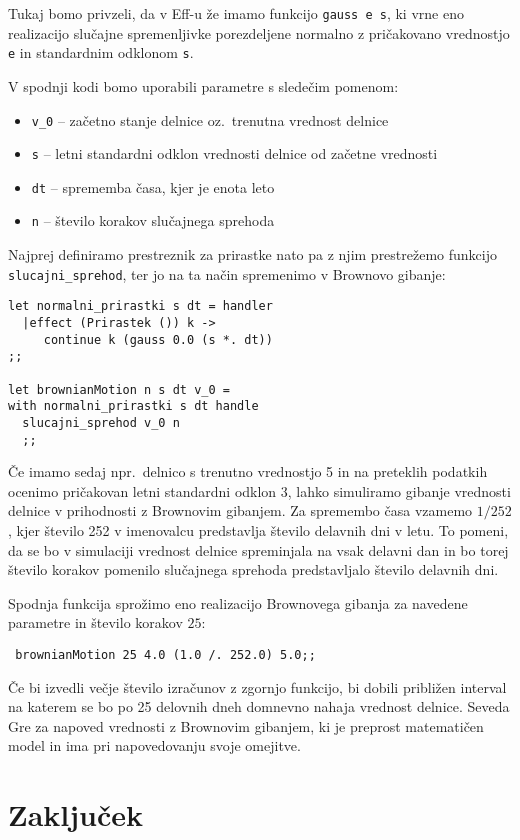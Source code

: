 \documentclass[a4paper,12pt]{article}
\theoremstyle{definition} %
\begin{document}
Tukaj bomo privzeli, da v Eff-u že imamo funkcijo \lstinline{gauss e s}, ki vrne eno realizacijo slučajne spremenljivke porezdeljene normalno z pričakovano vrednostjo \lstinline{e} in standardnim odklonom \lstinline{s}.

V spodnji kodi bomo uporabili parametre s sledečim pomenom:
\begin{itemize}
\item \lstinline{v_0} -- začetno stanje delnice oz.\ trenutna vrednost delnice
\item \lstinline{s} -- letni standardni odklon vrednosti delnice od začetne vrednosti
\item \lstinline{dt} -- sprememba časa, kjer je enota leto
\item \lstinline{n} -- število korakov slučajnega sprehoda
\end{itemize}
Najprej definiramo prestreznik za prirastke nato pa z njim prestrežemo funkcijo \lstinline{slucajni_sprehod}, ter jo na ta način spremenimo v Brownovo gibanje:
 \begin{lstlisting}
let normalni_prirastki s dt = handler
  |effect (Prirastek ()) k -> 
     continue k (gauss 0.0 (s *. dt))
;;

let brownianMotion n s dt v_0 =
with normalni_prirastki s dt handle
  slucajni_sprehod v_0 n
  ;;
\end{lstlisting}
Če imamo sedaj npr.\ delnico s trenutno vrednostjo 5 in na preteklih podatkih ocenimo pričakovan letni standardni odklon $3$, lahko simuliramo gibanje vrednosti delnice v prihodnosti z Brownovim gibanjem. Za spremembo časa vzamemo $1/252$, kjer število 252 v imenovalcu predstavlja število delavnih dni v letu. To pomeni, da se bo v simulaciji vrednost delnice spreminjala na vsak delavni dan in bo torej število korakov pomenilo slučajnega sprehoda predstavljalo število delavnih dni.

Spodnja funkcija sprožimo eno realizacijo Brownovega gibanja za navedene parametre in število korakov $25$:
 \begin{lstlisting}
 brownianMotion 25 4.0 (1.0 /. 252.0) 5.0;;
 \end{lstlisting}

Če bi izvedli večje število izračunov z zgornjo funkcijo, bi dobili približen interval na katerem se bo po 25 delovnih dneh domnevno nahaja vrednost delnice. Seveda Gre za napoved vrednosti z Brownovim gibanjem, ki je preprost matematičen model in ima pri napovedovanju svoje omejitve.

\section{Zaključek}
\end{document}
